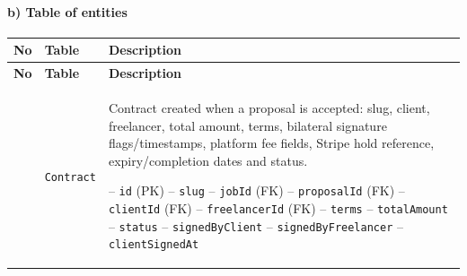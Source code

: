 \paragraph*{b) Table of entities}\nopagebreak[4]
\begin{center}\nopagebreak[4]
\small\sloppy
\begin{longtable}{|C{0.8cm}|L{3.8cm}|p{10.0cm}|}
\hline
{}\textbf{No} & \textbf{Table} & \textbf{Description} \\* \hline
\endfirsthead
\hline
{}\textbf{No} & \textbf{Table} & \textbf{Description} \\* \hline
\endhead
\hline\endfoot
\hline{} & \texttt{Contract} & Contract created when a proposal is accepted: slug, client, freelancer, total amount, terms, bilateral signature flags/timestamps, platform fee fields, Stripe hold reference, expiry/completion dates and status.\par\smallskip
\hspace*{1em}-- \texttt{id} (PK) \newline
\hspace*{1em}-- \texttt{slug} \newline
\hspace*{1em}-- \texttt{job\allowbreak Id} (FK) \newline
\hspace*{1em}-- \texttt{proposal\allowbreak Id} (FK) \newline
\hspace*{1em}-- \texttt{client\allowbreak Id} (FK) \newline
\hspace*{1em}-- \texttt{freelancer\allowbreak Id} (FK) \newline
\hspace*{1em}-- \texttt{terms} \newline
\hspace*{1em}-- \texttt{total\allowbreak Amount} \newline
\hspace*{1em}-- \texttt{status} \newline
\hspace*{1em}-- \texttt{signed\allowbreak By\allowbreak Client} \newline
\hspace*{1em}-- \texttt{signed\allowbreak By\allowbreak Freelancer} \newline
\hspace*{1em}-- \texttt{client\allowbreak Signed\allowbreak At} \newline

\end{longtable}
\end{center}

